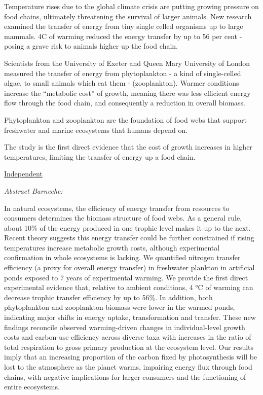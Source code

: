 \documentclass[
]{book}
\begin{document}
Temperature rises due to the global climate crisis are putting growing pressure on food chains,
ultimately threatening the survival of larger animals.
New research examined the transfer of energy from tiny single celled organisms up to large mammals.
4C of warming reduced the energy transfer by up to 56 per cent -
posing a grave risk to animals higher up the food chain.

Scientists from the University of Exeter and Queen Mary University of London
measured the transfer of energy from phytoplankton -
a kind of single-celled algae, to small animals which eat them - (zooplankton).
Warmer conditions increase the ``metabolic cost'' of growth,
meaning there was less efficient energy flow through the food chain,
and consequently a reduction in overall biomass.

Phytoplankton and zooplankton are the foundation of food webs that
support freshwater and marine ecosystems that humans depend on.

The study is the first direct evidence that the cost of growth increases in higher temperatures,
limiting the transfer of energy up a food chain.

\href{https://www.independent.co.uk/climate-change/news/food-chains-global-warming-animals-b1809501.html}{Independent}

\emph{Abstract Barneche:}

In natural ecosystems, the efficiency of energy transfer from resources to consumers
determines the biomass structure of food webs.
As a general rule, about 10\% of the energy produced in one trophic level makes it up to the next.
Recent theory suggests this energy transfer could be further constrained
if rising temperatures increase metabolic growth costs,
although experimental confirmation in whole ecosystems is lacking.
We quantified nitrogen transfer efficiency (a proxy for overall energy transfer)
in freshwater plankton in artificial ponds exposed to 7 years of experimental warming.
We provide the first direct experimental evidence that, relative to ambient conditions,
4 °C of warming can decrease trophic transfer efficiency by up to 56\%.
In addition, both phytoplankton and zooplankton biomass were lower in the warmed ponds,
indicating major shifts in energy uptake, transformation and transfer.
These new findings reconcile observed warming-driven changes in individual-level growth costs
and carbon-use efficiency across diverse taxa
with increases in the ratio of total respiration to gross primary production at the ecosystem level.
Our results imply that an increasing proportion of the carbon fixed by photosynthesis
will be lost to the atmosphere as the planet warms,
impairing energy flux through food chains,
with negative implications for larger consumers and the functioning of entire ecosystems.
\end{document}
